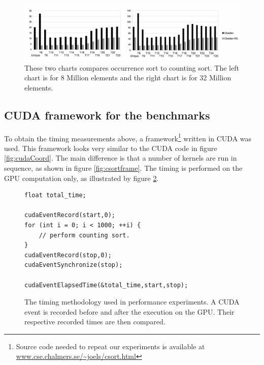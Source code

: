 \begin{figure}
\includegraphics[width=\linewidth]{./csort/chart2}
\caption{These two charts compares occurrence sort to  counting sort. 
The left chart is for 8 Million elements and the right chart is 
for 32 Million elements.}
\label{fig:chart2}
\end{figure}



\subsection{CUDA framework for the benchmarks}


To obtain the timing measurements above, a 
framework\footnote{Source code needed to repeat our experiments is available at \url{www.cse.chalmers.se/~joels/csort.html}} 
written in CUDA was used. 
This framework looks very similar to the CUDA code in figure \ref{fig:cudaCoord}. 
The main difference is that a number of kernels are run in sequence, as 
shown in figure \ref{fig:csortframe}. The timing is performed on the GPU 
computation only, as illustrated by figure \ref{fig:timing}.

\begin{figure} 
\begin{small}
\begin{verbatim} 
float total_time;

cudaEventRecord(start,0);
for (int i = 0; i < 1000; ++i) { 
    // perform counting sort. 
}
cudaEventRecord(stop,0);
cudaEventSynchronize(stop);
   
cudaEventElapsedTime(&total_time,start,stop);
\end{verbatim}
\end{small}
\caption{The timing methodology used in performance experiments. A CUDA event 
is recorded before and after the execution on the GPU. Their respective recorded times
are then compared.}
\label{fig:timing}
\end{figure}



